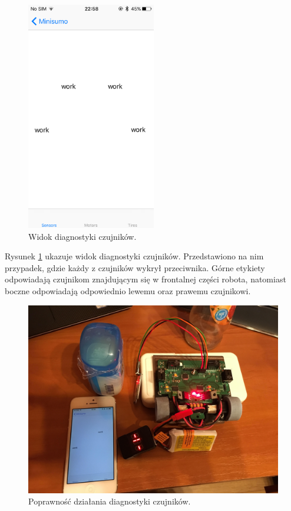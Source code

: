 \begin{figure}[H]
	\centering
		\includegraphics[width=0.75\linewidth, height=10cm, keepaspectratio, fbox]{pic05/sensors.PNG}
	\caption{Widok diagnostyki czujników.}
	\label{fig:diagsensors}	
\end{figure}

Rysunek \ref{fig:diagsensors} ukazuje widok diagnostyki czujników. Przedstawiono na nim przypadek, gdzie każdy z czujników wykrył przeciwnika. Górne etykiety odpowiadają czujnikom znajdującym się w frontalnej części robota, natomiast boczne odpowiadają odpowiednio lewemu oraz prawemu czujnikowi.


\begin{figure}[H]
	\centering
		\includegraphics[width=0.75\linewidth]{pic05/sensorsvis.jpg}
	\caption{Poprawność działania diagnostyki czujników.}
	\label{fig:realsensors}	
\end{figure}

